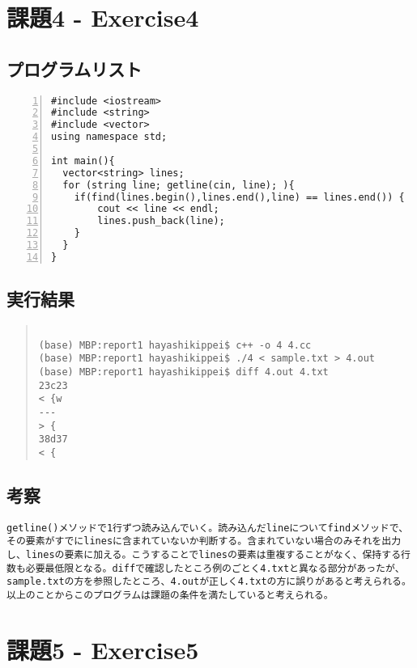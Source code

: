 \documentclass[11pt,a4paper]{jsarticle}
\begin{document}
\section{課題4 - Exercise4}
\subsection{プログラムリスト}
\label{sec:prog-list2}

\begin{lstlisting}[numbers=left,numberstyle=\ttfamily,xleftmargin=2zw]
#include <iostream>
#include <string>
#include <vector>
using namespace std;

int main(){
  vector<string> lines;
  for (string line; getline(cin, line); ){
    if(find(lines.begin(),lines.end(),line) == lines.end()) {
        cout << line << endl;
        lines.push_back(line);
    }
  }
}
\end{lstlisting}
%
\subsection{実行結果}
\begin{quote}           %
\begin{verbatim}

(base) MBP:report1 hayashikippei$ c++ -o 4 4.cc
(base) MBP:report1 hayashikippei$ ./4 < sample.txt > 4.out
(base) MBP:report1 hayashikippei$ diff 4.out 4.txt
23c23
< {w
---
> {
38d37
< {

\end{verbatim}
\end{quote}
%
\subsection{考察}
\begin{verbatim}
getline()メソッドで1行ずつ読み込んでいく。読み込んだlineについてfindメソッドで、その要素がすでにlinesに含まれていないか判断する。含まれていない場合のみそれを出力し、linesの要素に加える。こうすることでlinesの要素は重複することがなく、保持する行数も必要最低限となる。diffで確認したところ例のごとく4.txtと異なる部分があったが、sample.txtの方を参照したところ、4.outが正しく4.txtの方に誤りがあると考えられる。以上のことからこのプログラムは課題の条件を満たしていると考えられる。
\end{verbatim}
%
\section{課題5 - Exercise5}
\end{document}
